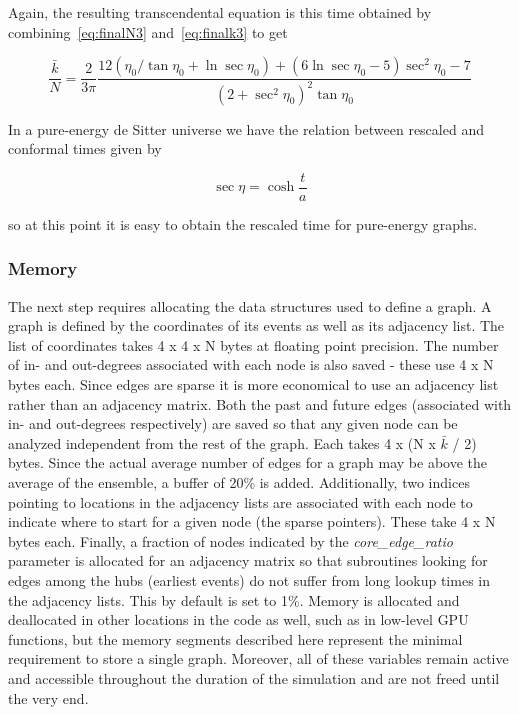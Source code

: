 \documentclass[preprint,notitlepage,amsmath,amssymb,floatfix]{revtex4-1}
\begin{document}
\noindent Again, the resulting transcendental equation is this time obtained by combining~\eqref{eq:finalN3} and~\eqref{eq:finalk3} to get

\begin{equation}
\label{eq:trans3}
\frac{\bar k}{N} = \frac{2}{3\pi}\frac{12\left(\eta_0/\tan\eta_0 + \ln\sec\eta_0\right) + \left(6\ln\sec\eta_0 - 5\right)\sec^2\eta_0 - 7}{\left(2+\sec^2\eta_0\right)^2\tan\eta_0}
\end{equation}

\noindent In a pure-energy de Sitter universe we have the relation between rescaled and conformal times given by 

\begin{equation}
\sec\eta = \cosh\frac{t}{a}
\end{equation}

\noindent so at this point it is easy to obtain the rescaled time for pure-energy graphs.
\subsubsection{Memory}
The next step requires allocating the data structures used to define a graph.  
A graph is defined by the coordinates of its events as well as its adjacency list.  
The list of coordinates takes 4 x 4 x N bytes at floating point precision.
The number of in- and out-degrees associated with each node is also saved - these use 4 x N bytes each.
Since edges are sparse it is more economical to use an adjacency list rather than an adjacency matrix.
Both the past and future edges (associated with in- and out-degrees respectively) are saved so that any given node can be analyzed independent from the rest of the graph.  
Each takes 4 x (N x $\bar k$ / 2) bytes.  
Since the actual average number of edges for a graph may be above the average of the ensemble, a buffer of 20\% is added.
Additionally, two indices pointing to locations in the adjacency lists are associated with each node to indicate where to start for a given node (the sparse pointers).
These take 4 x N bytes each.
Finally, a fraction of nodes indicated by the \textit{core\_edge\_ratio} parameter is allocated for an adjacency matrix so that subroutines looking for edges among the hubs (earliest events) do not suffer from long lookup times in the adjacency lists.  
This by default is set to 1\%.
Memory is allocated and deallocated in other locations in the code as well, such as in low-level GPU functions, but the memory segments described here represent the minimal requirement to store a single graph.
Moreover, all of these variables remain active and accessible throughout the duration of the simulation and are not freed until the very end.
\end{document}
